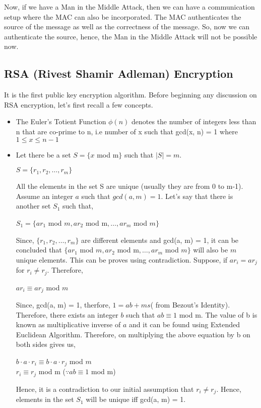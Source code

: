 \documentclass[11pt]{article}
\begin{document}
Now, if we have a Man in the Middle Attack, then we can have a communication setup where the MAC can also be incorporated. The MAC authenticates the source of the message as well as the correctness of the message. So, now we can authenticate the source, hence, the Man in the Middle Attack will not be possible now.

\subsection{RSA (Rivest Shamir Adleman) Encryption}
It is the first public key encryption algorithm. Before beginning any discussion on RSA encryption, let's first recall a few concepts.
\begin{itemize}
    \item The Euler's Totient Function $\phi(n)$ denotes the number of integers less than n that are co-prime to n, i.e number of x such that gcd(x, n) = 1 where $1 \leq x \leq n-1$
    \item Let there be a set $S = \{x$ mod m$\}$ such that $|S| = m$.
    \begin{center}
        $S = \{r_1, r_2,\hdots, r_m\}$
    \end{center}
    All the elements in the set S are unique (usually they are from 0 to m-1). Assume an integer $a$ such that $gcd(a, m) = 1$. Let's say that there is another set $S_1$ such that,
    \begin{center}
        $S_1 = \{ar_1$ mod $m, ar_2$ mod m$,\hdots, ar_m$ mod $m\}$
    \end{center}
    Since, $\{r_1, r_2,\hdots, r_m\}$ are different elements and gcd(a, m) = 1, it can be concluded that $\{ar_1$ mod $m, ar_2$ mod m$,\hdots, ar_m$ mod $m\}$ will also be $m$ unique elements. This can be proves using contradiction. Suppose, if $ar_i = ar_j$ for $r_i \neq r_j$. Therefore,
    \begin{center}
        $ar_i \equiv ar_j$ mod $m$
    \end{center}
    Since, gcd(a, m) = 1, therfore, $1 = ab + ms$( from Bezout's Identity). Therefore, there exists an integer $b$ such that $ab \equiv 1$ mod m. The value of b is known as multiplicative inverse of $a$ and it can be found using Extended Euclidean Algorithm.
    Therefore, on multiplying the above equation by b on both sides gives us,
    \begin{center}
        $b\cdot a\cdot r_i \equiv b\cdot a \cdot r_j$ mod $m$\\
        \vspace{3mm}
        $r_i \equiv r_j$ mod m    ($\because ab \equiv 1$ mod m)
    \end{center}
    Hence, it is a contradiction to our initial assumption that $r_i \neq r_j$. Hence, elements in the set $S_1$ will be unique iff gcd(a, m) = 1.
\end{itemize}
\end{document}
